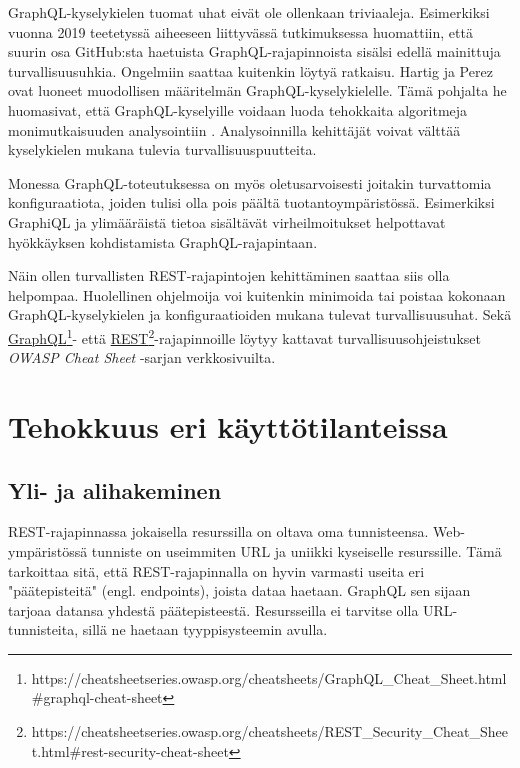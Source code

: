 GraphQL-kyselykielen tuomat uhat eivät ole ollenkaan triviaaleja. Esimerkiksi vuonna 2019 teetetyssä aiheeseen liittyvässä tutkimuksessa \cite{Wittern2019} huomattiin, että suurin osa GitHub:sta haetuista GraphQL-rajapinnoista sisälsi edellä mainittuja turvallisuusuhkia. Ongelmiin saattaa kuitenkin löytyä ratkaisu. Hartig ja Perez \cite{graphql-analysis} ovat luoneet muodollisen määritelmän GraphQL-kyselykielelle. Tämä pohjalta he huomasivat, että GraphQL-kyselyille voidaan luoda tehokkaita algoritmeja monimutkaisuuden analysointiin \cite{Hartig2018}. Analysoinnilla kehittäjät voivat välttää kyselykielen mukana tulevia turvallisuuspuutteita.

Monessa GraphQL-toteutuksessa on myös oletusarvoisesti joitakin turvattomia konfiguraatiota, joiden tulisi olla pois päältä tuotantoympäristössä. Esimerkiksi GraphiQL ja ylimääräistä tietoa sisältävät virheilmoitukset helpottavat hyökkäyksen kohdistamista GraphQL-rajapintaan. \cite{owasp-graphql}

Näin ollen turvallisten REST-rajapintojen kehittäminen saattaa siis olla helpompaa. Huolellinen ohjelmoija voi kuitenkin minimoida tai poistaa kokonaan GraphQL-kyselykielen ja konfiguraatioiden mukana tulevat turvallisuusuhat. Sekä \href{https://cheatsheetseries.owasp.org/cheatsheets/GraphQL_Cheat_Sheet.html#graphql-cheat-sheet}{GraphQL}\footnote{https://cheatsheetseries.owasp.org/cheatsheets/GraphQL\_Cheat\_Sheet.html\#graphql-cheat-sheet}- että \href{https://cheatsheetseries.owasp.org/cheatsheets/REST_Security_Cheat_Sheet.html#rest-security-cheat-sheet}{REST}\footnote{https://cheatsheetseries.owasp.org/cheatsheets/REST\_Security\_Cheat\_Sheet.html\#rest-security-cheat-sheet}-rajapinnoille löytyy kattavat turvallisuusohjeistukset \textit{OWASP Cheat Sheet} -sarjan verkkosivuilta. \cite{owasp-graphql, owasp-rest}

\section{Tehokkuus eri käyttötilanteissa}

\subsection{Yli- ja alihakeminen}

REST-rajapinnassa jokaisella resurssilla on oltava oma tunnisteensa. Web-ympäristössä tunniste on useimmiten URL ja uniikki kyseiselle resurssille. Tämä tarkoittaa sitä, että REST-rajapinnalla on hyvin varmasti useita eri "päätepisteitä" (engl. endpoints), joista dataa haetaan. GraphQL sen sijaan tarjoaa datansa yhdestä päätepisteestä. Resursseilla ei tarvitse olla URL-tunnisteita, sillä ne haetaan tyyppisysteemin avulla.

